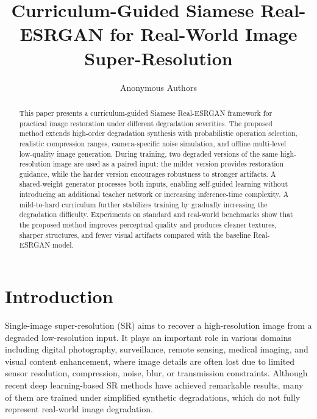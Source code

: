 \documentclass[runningheads]{llncs}
\begin{document}
\title{Curriculum-Guided Siamese Real-ESRGAN for Real-World Image Super-Resolution}

\author{Anonymous Authors}


\maketitle

\begin{abstract}

This paper presents a curriculum-guided Siamese Real-ESRGAN framework for practical image restoration under different degradation severities. The proposed method extends high-order degradation synthesis with probabilistic operation selection, realistic compression ranges, camera-specific noise simulation, and offline multi-level low-quality image generation. During training, two degraded versions of the same high-resolution image are used as a paired input: the milder version provides restoration guidance, while the harder version encourages robustness to stronger artifacts. A shared-weight generator processes both inputs, enabling self-guided learning without introducing an additional teacher network or increasing inference-time complexity. A mild-to-hard curriculum further stabilizes training by gradually increasing the degradation difficulty. Experiments on standard and real-world benchmarks show that the proposed method improves perceptual quality and produces cleaner textures, sharper structures, and fewer visual artifacts compared with the baseline Real-ESRGAN model.

\end{abstract}

\section{Introduction}

Single-image super-resolution (SR) aims to recover a high-resolution image from a degraded low-resolution input. It plays an important role in various domains including digital photography, surveillance, remote sensing, medical imaging, and visual content enhancement, where image details are often lost due to limited sensor resolution, compression, noise, blur, or transmission constraints. Although recent deep learning-based SR methods have achieved remarkable results, many of them are trained under simplified synthetic degradations, which do not fully represent real-world image degradation.
\end{document}
